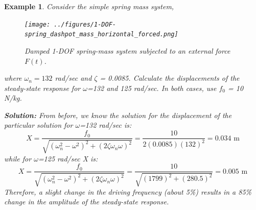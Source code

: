\documentclass[12pt,letter]{article}
\newtheorem{ex}{Example}
\numberwithin{ex}{section} %
\newenvironment{example}{\begin{mdframed}[middlelinewidth=0.5mm]\begin{ex}\normalfont}{\end{ex}\end{mdframed}}
\numberwithin{re}{section} %
\begin{document}
			
			
\begin{example}

			Consider the simple spring mass system, 
			\begin{figure}[H]
				\centering
				\texttt{[image: ../figures/1-DOF-spring\_dashpot\_mass\_horizontal\_forced.png]}
				\caption{Damped 1-DOF spring-mass system subjected to an external force $F(t)$.}
			\end{figure}				
			\noindent where $\omega_n = 132$ rad/sec and $\zeta$ = 0.0085. Calculate the displacements of the steady-state response for $\omega$=132 and 125 rad/sec. In both cases, use $f_0$ = 10 N/kg. 

			\noindent\textbf{Solution:}	From before, we know the solution for the displacement of the particular solution for $\omega$=132 rad/sec is:
			\begin{equation}
				X = \frac{f_0}{\sqrt{(\omega_n^2 - \omega^2)^2 +  (2\zeta \omega_n \omega)^2}} = \frac{10}{2(0.0085)(132)^2} = 0.034 \text{ m}
			\end{equation}							
			while for $\omega$=125 rad/sec X is:
			\begin{equation}
				X = \frac{f_0}{\sqrt{(\omega_n^2 - \omega^2)^2 +  (2\zeta \omega_n \omega)^2}} = \frac{10}{\sqrt{(1799)^2 +  (280.5)^2}}  = 0.005 \text{ m}
			\end{equation}				
			Therefore, a slight change in the driving frequency (about 5\%) results in a 85\% change in the amplitude of the steady-state response. 
\end{example}
\end{document}
